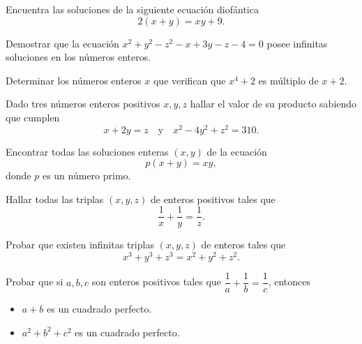\begin{exercise}
    Encuentra las soluciones de la siguiente ecuación diofántica
    \[
        2(x + y) = xy + 9.
    \]
\end{exercise}

\begin{exercise}
    Demostrar que la ecuación $x^2 + y^2 - z^2 - x + 3y - z - 4 = 0$ posee infinitas soluciones en los números enteros.
\end{exercise}

\begin{exercise}
    Determinar los números enteros $x$ que verifican que $x^4 + 2$ es múltiplo de $x + 2$.
\end{exercise}

\begin{exercise}
    Dado tres números enteros positivos $x,y,z$ hallar el valor de su producto sabiendo que cumplen
    \[
        x + 2y = z \quad \text{y} \quad x^2 - 4y^2 + z^2 = 310.
    \]
\end{exercise}

\begin{exercise}
    Encontrar todas las soluciones enteras $(x,y)$ de la ecuación
    \[
        p(x + y) = xy,
    \]
    donde $p$ es un número primo.
\end{exercise}

\begin{exercise}
    Hallar todas las triplas $(x,y,z)$ de enteros positivos tales que
    \[
        \frac{1}{x} + \frac{1}{y} = \frac{1}{z}.
    \]
\end{exercise}

\begin{exercise}
    Probar que existen infinitas triplas $(x,y,z)$ de enteros tales que
    \[
        x^3 + y^3 + z^3 = x^2 + y^2 + z^2.
    \]
\end{exercise}

\begin{problem}
    Probar que si $a,b,c$ son enteros positivos tales que $\dfrac{1}{a} + \dfrac{1}{b} = \dfrac{1}{c}$, entonces
    \begin{itemize}
        \item $a + b$ es un cuadrado perfecto.
        \item $a^2 + b^2 + c^2$ es un cuadrado perfecto.
    \end{itemize}
\end{problem}